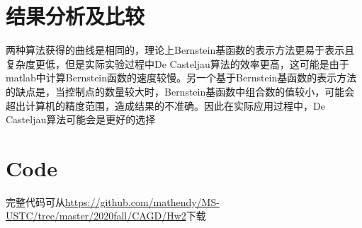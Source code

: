 \documentclass[12pt]{article}
\begin{document}
\section{结果分析及比较}
两种算法获得的曲线是相同的，理论上Bernstein基函数的表示方法更易于表示且复杂度更低，但是实际实验过程中De Casteljau算法的效率更高，这可能是由于matlab中计算Bernstein函数的速度较慢。另一个基于Bernstein基函数的表示方法的缺点是，当控制点的数量较大时，Bernstein基函数中组合数的值较小，可能会超出计算机的精度范围，造成结果的不准确。因此在实际应用过程中，De Casteljau算法可能会是更好的选择

\appendix
\section{Code}
完整代码可从\url{https://github.com/mathendy/MS-USTC/tree/master/2020fall/CAGD/Hw2}下载
\end{document}
